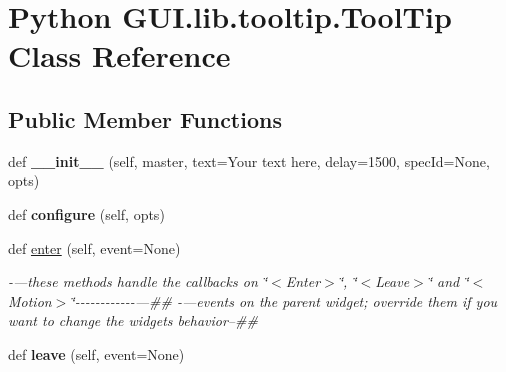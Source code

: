 \hypertarget{class_python_01_g_u_i_1_1lib_1_1tooltip_1_1_tool_tip}{}\section{Python G\+U\+I.\+lib.\+tooltip.\+Tool\+Tip Class Reference}
\label{class_python_01_g_u_i_1_1lib_1_1tooltip_1_1_tool_tip}
\subsection*{Public Member Functions}
\begin{DoxyCompactItemize}
\item 
\mbox{\label{class_python_01_g_u_i_1_1lib_1_1tooltip_1_1_tool_tip_a07879afa2376ac613dbe7995022ee1d8}} 
def {\bfseries \+\_\+\+\_\+init\+\_\+\+\_\+} (self, master, text=\textquotesingle{}Your text here\textquotesingle{}, delay=1500, spec\+Id=None, opts)
\item 
\mbox{\label{class_python_01_g_u_i_1_1lib_1_1tooltip_1_1_tool_tip_a79fa162ef47347e5a2da40e6d4b6e525}} 
def {\bfseries configure} (self, opts)
\item 
\mbox{\label{class_python_01_g_u_i_1_1lib_1_1tooltip_1_1_tool_tip_ace65e3c45b1bf25ac028f6cd25a7d98d}} 
def \hyperlink{class_python_01_g_u_i_1_1lib_1_1tooltip_1_1_tool_tip_ace65e3c45b1bf25ac028f6cd25a7d98d}{enter} (self, event=None)
\begin{DoxyCompactList}\small\item\em -\/---these methods handle the callbacks on \char`\"{}$<$\+Enter$>$\char`\"{}, \char`\"{}$<$\+Leave$>$\char`\"{} and \char`\"{}$<$\+Motion$>$\char`\"{}-\/-\/-\/-\/-\/-\/-\/-\/-\/-\/-\/-\/---\#\# -\/---events on the parent widget; override them if you want to change the widget\textquotesingle{}s behavior--\#\# \end{DoxyCompactList}\item 
\mbox{\label{class_python_01_g_u_i_1_1lib_1_1tooltip_1_1_tool_tip_a8779712ef0648e79cfda8d72a9f37923}} 
def {\bfseries leave} (self, event=None)
\item 

\end{DoxyCompactItemize}
